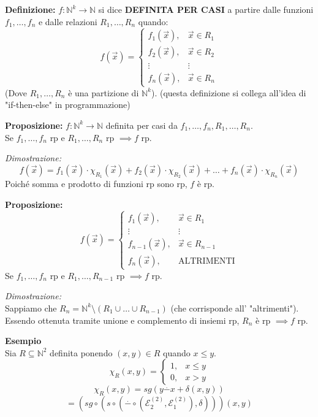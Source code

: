 \vspace{0.6cm}
\textbf{Definizione:} $f: \mathbb{N}^k \to \mathbb{N}$ si dice \textbf{DEFINITA PER CASI} a partire dalle funzioni $f_1, \dots, f_n$ e dalle relazioni $R_1, \dots, R_n$ quando:
$$
f(\vec{x}) = 
\begin{cases} 
f_1(\vec{x}), & \vec{x} \in R_1 \\ 
f_2(\vec{x}), & \vec{x} \in R_2 \\ 
\vdots & \vdots \\
f_n(\vec{x}), & \vec{x} \in R_n 
\end{cases}
$$
(Dove $R_1, \dots, R_n$ è una partizione di $\mathbb{N}^k$). (questa definizione si collega all'idea di "if-then-else" in programmazione)

\vspace{0.4cm}
\textbf{Proposizione:} $f: \mathbb{N}^k \to \mathbb{N}$ definita per casi da $f_1, \dots, f_n, R_1, \dots, R_n$. \\
Se $f_1, \dots, f_n$ rp e $R_1, \dots, R_n$ rp $\implies f$ rp.

\textit{Dimostrazione:}
$$ f(\vec{x}) = f_1(\vec{x}) \cdot \chi_{R_1}(\vec{x}) + f_2(\vec{x}) \cdot \chi_{R_2}(\vec{x}) + \dots + f_n(\vec{x}) \cdot \chi_{R_n}(\vec{x}) $$
Poiché somma e prodotto di funzioni rp sono rp, $f$ è rp.

\vspace{0.4cm}
\textbf{Proposizione:}
$$
f(\vec{x}) = 
\begin{cases} 
f_1(\vec{x}), & \vec{x} \in R_1 \\ 
\vdots & \vdots \\
f_{n-1}(\vec{x}), & \vec{x} \in R_{n-1} \\
f_n(\vec{x}), & \text{ALTRIMENTI} 
\end{cases}
$$
Se $f_1, \dots, f_n$ rp e $R_1, \dots, R_{n-1}$ rp $\implies f$ rp.

\textit{Dimostrazione:} \\
Sappiamo che $R_n = \mathbb{N}^k \setminus (R_1 \cup \dots \cup R_{n-1})$ (che corrisponde all' "altrimenti"). 
Essendo ottenuta tramite unione e complemento di insiemi rp, $R_n$ è rp $\implies f$ rp.

\vspace{0.6cm}
\textbf{Esempio} \\
Sia $R \subseteq \mathbb{N}^2$ definita ponendo $(x,y) \in R$ quando $x \le y$.
$$
\chi_R(x,y) = 
\begin{cases} 
1, & x \le y \\ 
0, & x > y 
\end{cases}
$$
$$ \chi_R(x,y) = sg(y \overset{\cdot}{-} x + \delta(x,y)) $$
$$ = \left( sg \circ (s \circ (\overset{\cdot}{-} \circ (\mathcal{E}_2^{(2)}, \mathcal{E}_1^{(2)}), \delta)) \right)(x,y) $$

